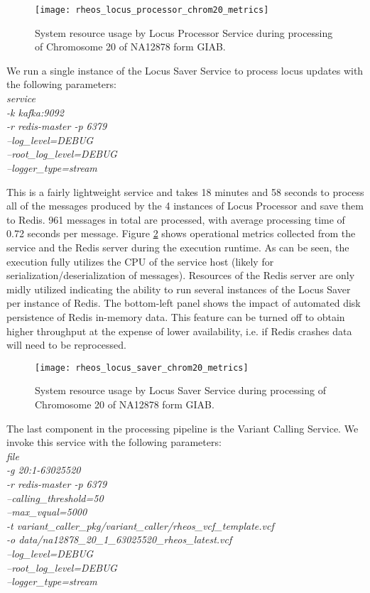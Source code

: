 \begin{figure}[h!]
    \texttt{[image: rheos\_locus\_processor\_chrom20\_metrics]}
    \centering
    \caption {System resource usage by Locus Processor Service during processing of Chromosome 20 of NA12878 form GIAB.}
    \label{fig:rheos_locus_processor_chrom20_metrics}
\end{figure}


We run a single instance of the Locus Saver Service to process locus updates with the following parameters:
\\
\emph{service\\
-k kafka:9092\\
-r redis-master -p 6379\\
--log\_level=DEBUG\\
--root\_log\_level=DEBUG\\
--logger\_type=stream}

This is a fairly lightweight service and takes 18 minutes and 58 seconds to process all of the messages produced by the  4 instances of Locus Processor and save them to Redis. 961 messages in total are processed, with average processing time of 0.72 seconds per message. Figure \ref{fig:rheos_locus_saver_chrom20_metrics} shows operational metrics collected from the service and the Redis server during the execution runtime. As can be seen, the execution fully utilizes the CPU of the service host (likely for serialization/deserialization of messages). Resources of the Redis server are only midly utilized indicating the ability to run several instances of the Locus Saver per instance of Redis. The bottom-left panel shows the impact of automated disk persistence of Redis in-memory data. This feature can be turned off to obtain higher throughput at the expense of lower availability, i.e. if Redis crashes data will need to be reprocessed.   

\begin{figure}[h!]
    \texttt{[image: rheos\_locus\_saver\_chrom20\_metrics]}
    \centering
    \caption {System resource usage by Locus Saver Service during processing of Chromosome 20 of NA12878 form GIAB.}
    \label{fig:rheos_locus_saver_chrom20_metrics}
\end{figure}

The last component in the processing pipeline is the Variant Calling Service. We invoke this service with the following parameters:
\\
\emph{file\\
-g 20:1-63025520\\
-r redis-master -p 6379\\
--calling\_threshold=50\\
--max\_vqual=5000\\
-t variant\_caller\_pkg/variant\_caller/rheos\_vcf\_template.vcf\\
-o data/na12878\_20\_1\_63025520\_rheos\_latest.vcf\\
--log\_level=DEBUG\\
--root\_log\_level=DEBUG\\
--logger\_type=stream}

